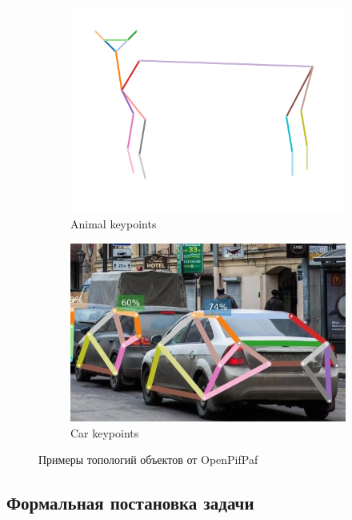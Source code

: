 \begin{figure}[h]
\begin{subfigure}[b]{0.48\textwidth}
	\centering
	\includegraphics[width=\textwidth]{./images/tasks/animal_pose.png}
	\caption{Animal keypoints}
\end{subfigure}
\begin{subfigure}[b]{0.48\textwidth}
	\centering
	\includegraphics[width=\textwidth]{./images/tasks/car_topology.jpg}
	\caption{Car keypoints}
\end{subfigure}
	\caption{Примеры топологий объектов от OpenPifPaf \cite{OpenPifPaf2021}}
	\label{fig:topology_exaples}
\end{figure}

\subsection{Формальная постановка задачи}
\label{subsec:keypoint_task}

